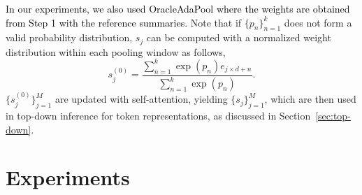 \documentclass{article} \usepackage{iclr2022_conference,times}
\begin{document}
\textcolor{black}{In our experiments, we also used OracleAdaPool where the weights are obtained from Step 1 with the reference summaries.}
Note that if $\{p_n\}_{n=1}^k$ does not form a valid probability distribution, $s_j$ can be computed with a normalized weight distribution within each pooling window as follows,
\begin{equation}
    s_j^{(0)} = \frac{\sum_{n=1}^k \exp(p_n) e_{j \times d + n}}{\sum_{n=1}^k \exp(p_n)}.
\end{equation}
$\{s_j^{(0)}\}_{j=1}^M$ are updated with self-attention, yielding $\{s_j\}_{j=1}^M$, which are then used in top-down inference for token representations, as discussed in Section~\ref{sec:top-down}. 

\section{Experiments}
\end{document}
